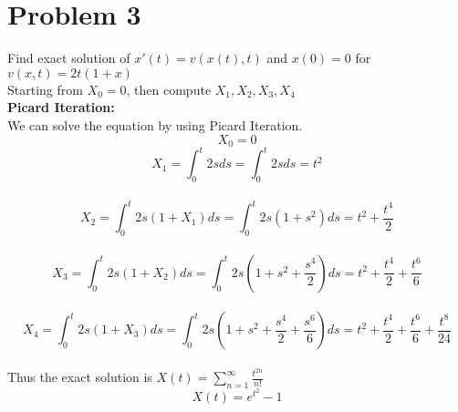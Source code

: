 \documentclass{article}
\begin{document}
\section*{Problem 3}
Find exact solution of $x'(t) = v(x(t),t)$ and $x(0) = 0$ for $v(x,t) = 2t(1+x)$\\ 
Starting from $X_0 = 0$, then compute $X_1, X_2, X_3, X_4$\\
\textbf{Picard Iteration:}\\
We can solve the equation by using Picard Iteration.\\
$$X_0 = 0$$
$$X_1 = \int_0^t 2sds = \int_0^t 2sds = t^2$$\\
$$X_2 = \int_0^t 2s(1 + X_1)ds = \int_0^t
2s(1+s^2)ds = t^2 + \frac{t^4}{2}$$\\
$$X_3 = \int_0^t 2s(1 + X_2)ds = \int_0^t 2s(1 + s^2 + \frac{s^4}{2})ds = t^2 + \frac{t^4}{2} + \frac{t^6}{6}$$\\
$$X_4 = \int_0^t 2s(1 + X_3)ds = \int_0^t 2s(1 + s^2 + \frac{s^4}{2} + \frac{s^6}{6})ds = t^2 + \frac{t^4}{2} + \frac{t^6}{6} + \frac{t^8}{24}$$\\
Thus the exact solution is $X(t) = \sum_{n=1}^{\infty} \frac{t^{2n}}{n!}$\\
$$X(t) = e^{t^2} - 1$$
\end{document}
